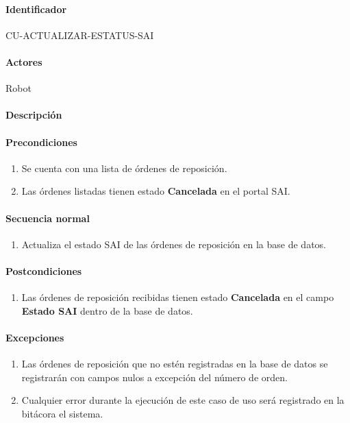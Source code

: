 \paragraph{Identificador}
CU-ACTUALIZAR-ESTATUS-SAI
\paragraph{Actores}
Robot
\paragraph{Descripción}
\paragraph{Precondiciones}
\begin{enumerate}
  \item Se cuenta con una lista de órdenes de reposición.
  \item Las órdenes listadas tienen estado \textbf{Cancelada} en el portal SAI. 
\end{enumerate}
\paragraph{Secuencia normal}
\begin{enumerate}
  \item Actualiza el estado SAI de las órdenes de reposición en la base de datos.
\end{enumerate}
\paragraph{Postcondiciones}
\begin{enumerate}
  \item Las órdenes de reposición recibidas tienen estado \textbf{Cancelada} en el campo \textbf{Estado SAI} dentro de la base de datos.
\end{enumerate}
\paragraph{Excepciones}
\begin{enumerate}
  \item Las órdenes de reposición que no estén registradas en la base de datos se registrarán con campos nulos a excepción del número de orden.
  \item Cualquier error durante la ejecución de este caso de uso será registrado en la bitácora el sistema.
\end{enumerate}


